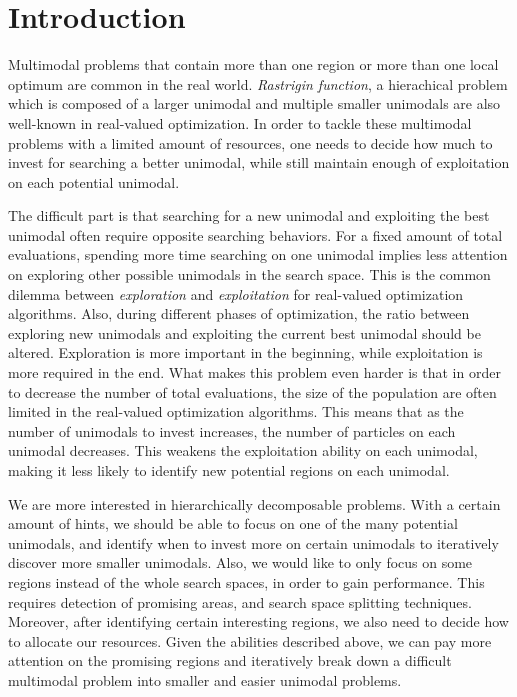 \chapter{Introduction}
\label{c:intro}

Multimodal problems that contain more than one region or more than one local optimum are common in the real world.
{\em Rastrigin function}, a hierachical problem which is composed of a larger unimodal and multiple smaller unimodals are also well-known in real-valued optimization.
In order to tackle these multimodal problems with a limited amount of resources, 
one needs to decide how much to invest for searching a better unimodal, 
while still maintain enough of exploitation on each potential unimodal.

The difficult part is that searching for a new unimodal and exploiting the best unimodal often require opposite searching behaviors.
For a fixed amount of total evaluations, spending more time searching on one unimodal implies 
less attention on exploring other possible unimodals in the search space.
This is the common dilemma between {\em exploration} and {\em exploitation} for real-valued optimization algorithms.
Also, during different phases of optimization, 
the ratio between exploring new unimodals and exploiting the current best unimodal should be altered.
Exploration is more important in the beginning, while exploitation is more required in the end.
What makes this problem even harder is that in order to decrease the number of total evaluations, 
the size of the population are often limited in the real-valued optimization algorithms.
This means that as the number of unimodals to invest increases, the number of particles on each unimodal decreases.
This weakens the exploitation ability on each unimodal, making it less likely to identify new potential regions on each unimodal.

We are more interested in hierarchically decomposable problems.
With a certain amount of hints, we should be able to focus on one of the many potential unimodals, 
and identify when to invest more on certain unimodals to iteratively discover more smaller unimodals.
Also, we would like to only focus on some regions instead of the whole search spaces, in order to gain performance.
This requires detection of promising areas, and search space splitting techniques.
Moreover, after identifying certain interesting regions, we also need to decide how to allocate our resources.
Given the abilities described above, 
we can pay more attention on the promising regions and 
iteratively break down a difficult multimodal problem into smaller and easier unimodal problems.

